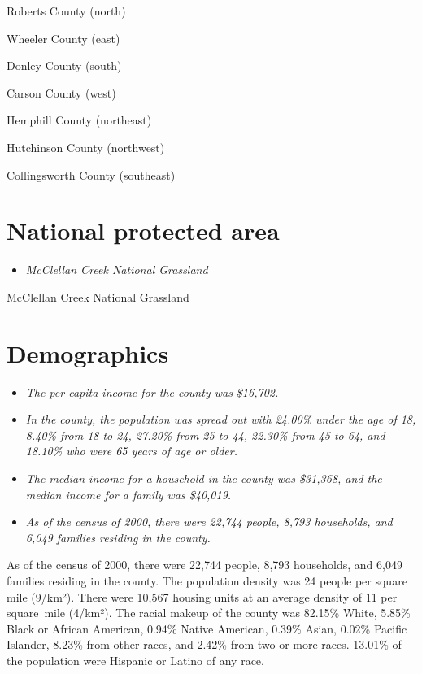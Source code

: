 Roberts County (north)

Wheeler County (east)

Donley County (south)

Carson County (west)

Hemphill County (northeast)

Hutchinson County (northwest)

Collingsworth County (southeast)

\section{National protected area}\label{national-protected-area}

\begin{itemize}
\item
  \emph{McClellan Creek National Grassland}
\end{itemize}

McClellan Creek National Grassland

\section{Demographics}\label{demographics}

\begin{itemize}
\item
  \emph{The per capita income for the county was \$16,702.}
\item
  \emph{In the county, the population was spread out with 24.00\% under
  the age of 18, 8.40\% from 18 to 24, 27.20\% from 25 to 44, 22.30\%
  from 45 to 64, and 18.10\% who were 65 years of age or older.}
\item
  \emph{The median income for a household in the county was \$31,368,
  and the median income for a family was \$40,019.}
\item
  \emph{As of the census of 2000, there were 22,744 people, 8,793
  households, and 6,049 families residing in the county.}
\end{itemize}

As of the census of 2000, there were 22,744 people, 8,793 households,
and 6,049 families residing in the county. The population density was 24
people per square mile (9/km²). There were 10,567 housing units at an
average density of 11 per square~mile (4/km²). The racial makeup of the
county was 82.15\% White, 5.85\% Black or African American, 0.94\%
Native American, 0.39\% Asian, 0.02\% Pacific Islander, 8.23\% from
other races, and 2.42\% from two or more races. 13.01\% of the
population were Hispanic or Latino of any race.

